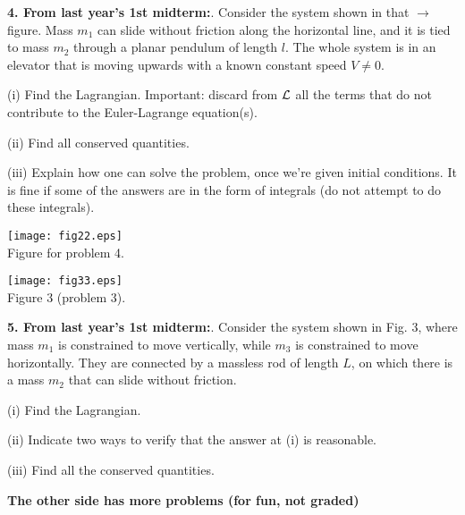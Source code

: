 \documentclass{article}
\begin{document}
\vspace{5mm}

\noindent\begin{minipage}[c]{120mm}
{\bf 4. From last year's 1st midterm:}.
Consider the system shown in that $\rightarrow$ figure. Mass $m_1$ can slide without friction along the horizontal line, and it is tied to mass $m_2$ through a planar pendulum of length $l$. The whole system is in an elevator that is moving upwards with a known constant speed $V\ne 0 $.

(i) Find the Lagrangian. Important: discard from ${\cal L}$ all the terms that do not contribute to the Euler-Lagrange equation(s). 

(ii) Find all conserved quantities.

(iii) Explain how one can solve the problem, once we're given initial conditions. It is fine if some of the answers are in the form of integrals (do not attempt to do these integrals). 


\end{minipage} 
\hfill
\begin{minipage}[c]{50mm}
\centering
\texttt{[image: fig22.eps]}
\\{\small Figure for problem 4.}
\end{minipage}


\vspace{5mm} 

\noindent
\begin{minipage}[b]{50mm}
\texttt{[image: fig33.eps]}
\\{\small Figure 3 (problem 3).}
\end{minipage}
\hfill
\begin{minipage}[b]{130mm}
  {\bf 5. From last year's 1st midterm:}. Consider the system shown in Fig. 3, where mass $m_1$ is constrained to move vertically, while $m_3$ is constrained to move horizontally. They are connected by a massless rod of length $L$, on which there is a mass $m_2$ that can slide without friction.

  (i) Find the Lagrangian.

  (ii) Indicate two ways to verify that the answer at (i) is reasonable. 
  
  (iii) Find all the conserved quantities.

\end{minipage}

\vfill

{\bf The other side has more problems (for fun, not graded)}
\end{document}
